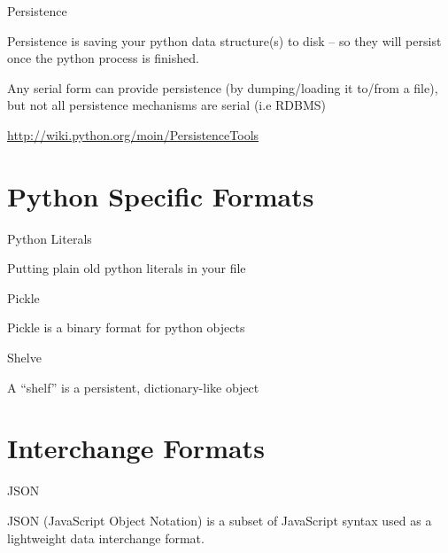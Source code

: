 \documentclass{beamer}
\begin{document}
\begin{frame}[fragile]{Persistence}

\vfill
{\Large Persistence is saving your python data structure(s) to disk -- so they
will persist once the python process is finished.}

\vfill
{\Large Any serial form can provide persistence (by dumping/loading it to/from
a file), but not all persistence mechanisms are serial (i.e RDBMS)}


\vfill
\url{http://wiki.python.org/moin/PersistenceTools}
\end{frame} 


\section{Python Specific Formats}

\begin{frame}[fragile]{Python Literals}

\vfill
{\Large Putting plain old python literals in your file}

\end{frame} 

\begin{frame}[fragile]{Pickle}

\vfill
{\Large Pickle is a binary format for python objects}

\end{frame} 

\begin{frame}[fragile]{Shelve}

\vfill
{\Large A “shelf” is a persistent, dictionary-like object}

\end{frame} 


\section{Interchange Formats} 

\begin{frame}[fragile]{JSON}

\vfill
{\Large JSON (JavaScript Object Notation) is a subset of JavaScript syntax
        used as a lightweight data interchange format.}

\end{frame} 
\end{document}
